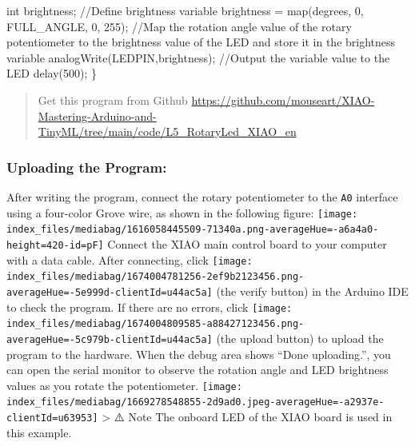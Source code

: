 \documentclass[
  letterpaper,
  DIV=11,
  numbers=noendperiod]{scrreprt}
\newenvironment{Shaded}{\begin{snugshade}}{\end{snugshade}}
\newcommand{\CommentTok}[1]{\textcolor[rgb]{0.37,0.37,0.37}{#1}}
\newcommand{\DataTypeTok}[1]{\textcolor[rgb]{0.68,0.00,0.00}{#1}}
\newcommand{\DecValTok}[1]{\textcolor[rgb]{0.68,0.00,0.00}{#1}}
\newcommand{\NormalTok}[1]{\textcolor[rgb]{0.00,0.23,0.31}{#1}}
\newcommand{\OperatorTok}[1]{\textcolor[rgb]{0.37,0.37,0.37}{#1}}
\begin{document}
\begin{Shaded}
\begin{Highlighting}[]
    \DataTypeTok{int}\NormalTok{ brightness}\OperatorTok{;} \CommentTok{//Define brightness variable}
\NormalTok{    brightness }\OperatorTok{=}\NormalTok{ map}\OperatorTok{(}\NormalTok{degrees}\OperatorTok{,} \DecValTok{0}\OperatorTok{,}\NormalTok{ FULL\_ANGLE}\OperatorTok{,} \DecValTok{0}\OperatorTok{,} \DecValTok{255}\OperatorTok{);} \CommentTok{//Map the rotation angle value of the rotary potentiometer to the brightness value of the LED and store it in the brightness variable}
\NormalTok{    analogWrite}\OperatorTok{(}\NormalTok{LEDPIN}\OperatorTok{,}\NormalTok{brightness}\OperatorTok{);} \CommentTok{//Output the variable value to the LED}
\NormalTok{    delay}\OperatorTok{(}\DecValTok{500}\OperatorTok{);}
\OperatorTok{\}}
\end{Highlighting}
\end{Shaded}

\begin{quote}
Get this program from Github
\url{https://github.com/mouseart/XIAO-Mastering-Arduino-and-TinyML/tree/main/code/L5_RotaryLed_XIAO_en}
\end{quote}

\hypertarget{uploading-the-program-3}{%
\subsubsection*{Uploading the Program:}\label{uploading-the-program-3}}

After writing the program, connect the rotary potentiometer to the
\texttt{A0} interface using a four-color Grove wire, as shown in the
following figure:
\texttt{[image: index\_files/mediabag/1616058445509-71340a.png-averageHue=-a6a4a0-height=420-id=pF]}
Connect the XIAO main control board to your computer with a data cable.
After connecting, click
\texttt{[image: index\_files/mediabag/1674004781256-2ef9b2123456.png-averageHue=-5e999d-clientId=u44ac5a]}
(the verify button) in the Arduino IDE to check the program. If there
are no errors, click
\texttt{[image: index\_files/mediabag/1674004809585-a88427123456.png-averageHue=-5c979b-clientId=u44ac5a]}
(the upload button) to upload the program to the hardware. When the
debug area shows ``Done uploading.'', you can open the serial monitor to
observe the rotation angle and LED brightness values as you rotate the
potentiometer.
\texttt{[image: index\_files/mediabag/1669278548855-2d9ad0.jpeg-averageHue=-a2937e-clientId=u63953]}
\textgreater{} ⚠️ Note The onboard LED of the XIAO board is used in this
example.
\end{document}
